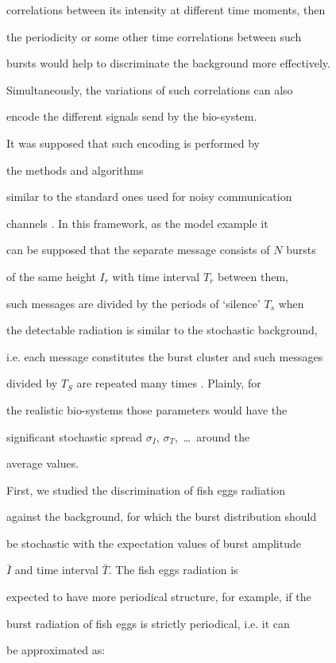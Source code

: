 correlations between its intensity at different time moments, then

the periodicity or some other time correlations between such

bursts would help to discriminate the background more effectively.

Simultaneously, the variations of such correlations can also

encode the different signals send by the bio-system.

 It was supposed that such encoding is performed by

 the methods and algorithms

similar to the standard ones used for noisy communication

channels  \cite {mayb:C4}. In this framework, as the model example it

can be supposed that the separate message consists of $N$ bursts

of the same height $I_r$ with time interval $T_r$ between them,

such messages are divided by the periods of `silence' $T_s$ when

the detectable radiation is similar to the stochastic background,

i.e. each message constitutes the burst cluster and such messages

divided by $T_S$ are repeated many times \cite {mayb:C4}. Plainly, for

the realistic bio-systems  those parameters would have the

significant stochastic spread $\sigma_I$, $\sigma_T$,~\dots\ around the

average values.





First, we studied the discrimination of fish eggs radiation

against the background, for which the burst distribution should

be stochastic with the expectation values of burst amplitude

$\bar I$ and time interval $\bar T$. The fish eggs radiation is

expected to have more periodical structure, for example,  if the

burst radiation of fish eggs is strictly periodical, i.e. it can

be approximated as:

$$

